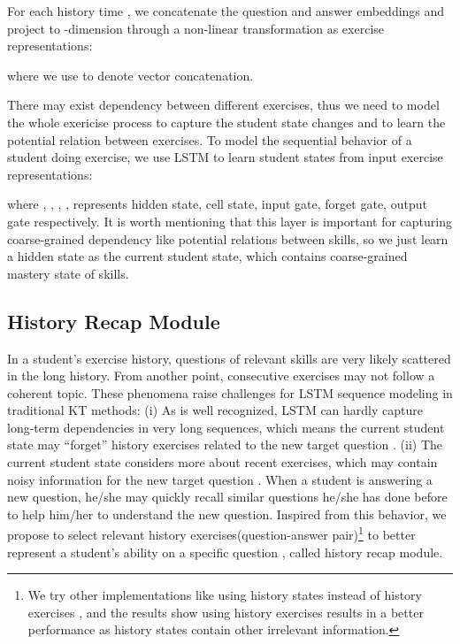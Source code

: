 \documentclass[runningheads]{llncs}
\begin{document}
For each history time , we concatenate the question and answer embeddings and project to -dimension through a non-linear transformation as exercise representations:

where we use  to denote vector concatenation.

There may exist dependency between different exercises, thus we need to model the whole exericise process to capture the student state changes and to learn the potential relation between exercises. To model the sequential behavior of a student doing exercise, we use LSTM \cite{hochreiter1997long} to learn student states from input exercise representations:

where , ,  , ,  represents hidden state, cell state, input gate, forget gate, output gate respectively. It is worth mentioning that this layer is important for capturing coarse-grained dependency like potential relations between skills, so we just learn a hidden state  as the current student state, which contains coarse-grained mastery state of skills.


\subsection{History Recap Module}

In a student's exercise history, questions of relevant skills are very likely scattered in the long history. From another point, consecutive exercises may not follow a coherent topic. These phenomena raise challenges for LSTM sequence modeling in traditional KT methods: (i) As is well recognized, LSTM can hardly capture long-term dependencies in very long sequences, which means the current student state  may ``forget'' history exercises related to the new target question . (ii) The current student state  considers more about recent exercises, which may contain noisy information for the new target question . When a student is answering a new question, he/she may quickly recall similar questions he/she has done before to help him/her to understand the new question. Inspired from this behavior, we propose to select relevant history exercises(question-answer pair)\footnote{We try other implementations like using history states instead of history exercises , and the results show using history exercises results in a better performance 
	as history states contain other irrelevant information.}  to better represent a student's ability on a specific question , called history recap module. 
\end{document}
